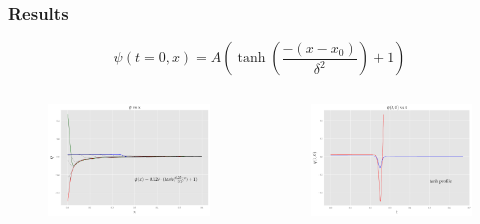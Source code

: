 \documentclass[hyperref={bookmarks=false},aspectratio=169]{beamer}
\begin{document}
\begin{frame}
  \frametitle{Results}

  \begin{equation*}
    \psi(t=0, x)=A\left(\tanh \left(\frac{-\left(x-x_{0}\right)}{\delta^{2}}\right)+1\right)
  \end{equation*}

  \begin{columns}
    \begin{figure}
      \centering
      \includegraphics[width=1\linewidth]{images/super_tanh.pdf}
    \end{figure}
    \begin{figure}
      \centering
      \includegraphics[width=1\linewidth]{images/at0_tanh.pdf}
    \end{figure}
  \end{columns}

\end{frame}
\end{document}
